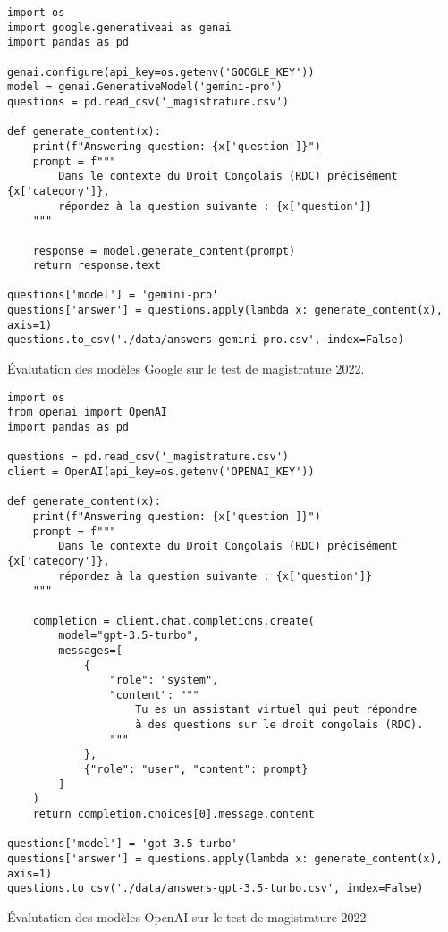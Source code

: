 \begin{listing}[!ht]
\begin{verbatim}
import os
import google.generativeai as genai
import pandas as pd

genai.configure(api_key=os.getenv('GOOGLE_KEY'))
model = genai.GenerativeModel('gemini-pro')
questions = pd.read_csv('_magistrature.csv')

def generate_content(x):
    print(f"Answering question: {x['question']}")
    prompt = f"""
        Dans le contexte du Droit Congolais (RDC) précisément {x['category']},
        répondez à la question suivante : {x['question']}
    """

    response = model.generate_content(prompt)
    return response.text

questions['model'] = 'gemini-pro'
questions['answer'] = questions.apply(lambda x: generate_content(x), axis=1)
questions.to_csv('./data/answers-gemini-pro.csv', index=False)
\end{verbatim}
\caption{Évalutation des modèles Google sur le test de magistrature 2022.}
\label{appendix:code:python:gemini-pro-evaluation}
\end{listing}

\begin{listing}[!ht]
\begin{verbatim}
import os
from openai import OpenAI
import pandas as pd

questions = pd.read_csv('_magistrature.csv')
client = OpenAI(api_key=os.getenv('OPENAI_KEY'))

def generate_content(x):
    print(f"Answering question: {x['question']}")
    prompt = f"""
        Dans le contexte du Droit Congolais (RDC) précisément {x['category']},
        répondez à la question suivante : {x['question']}
    """

    completion = client.chat.completions.create(
        model="gpt-3.5-turbo",
        messages=[
            {
                "role": "system",
                "content": """
                    Tu es un assistant virtuel qui peut répondre 
                    à des questions sur le droit congolais (RDC).
                """
            },
            {"role": "user", "content": prompt}
        ]
    )
    return completion.choices[0].message.content

questions['model'] = 'gpt-3.5-turbo'
questions['answer'] = questions.apply(lambda x: generate_content(x), axis=1)
questions.to_csv('./data/answers-gpt-3.5-turbo.csv', index=False)
\end{verbatim}
\caption{Évalutation des modèles OpenAI sur le test de magistrature 2022.}
\label{appendix:code:python:gpt-3-evaluation}
\end{listing}
